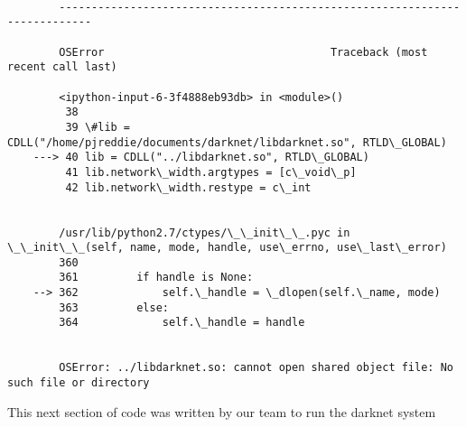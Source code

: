 \documentclass[11pt]{article}
\begin{document}
    \begin{Verbatim}[commandchars=\\\{\}]

        ---------------------------------------------------------------------------

        OSError                                   Traceback (most recent call last)

        <ipython-input-6-3f4888eb93db> in <module>()
         38 
         39 \#lib = CDLL("/home/pjreddie/documents/darknet/libdarknet.so", RTLD\_GLOBAL)
    ---> 40 lib = CDLL("../libdarknet.so", RTLD\_GLOBAL)
         41 lib.network\_width.argtypes = [c\_void\_p]
         42 lib.network\_width.restype = c\_int


        /usr/lib/python2.7/ctypes/\_\_init\_\_.pyc in \_\_init\_\_(self, name, mode, handle, use\_errno, use\_last\_error)
        360 
        361         if handle is None:
    --> 362             self.\_handle = \_dlopen(self.\_name, mode)
        363         else:
        364             self.\_handle = handle


        OSError: ../libdarknet.so: cannot open shared object file: No such file or directory

    \end{Verbatim}

    This next section of code was written by our team to run the darknet
system
\end{document}
